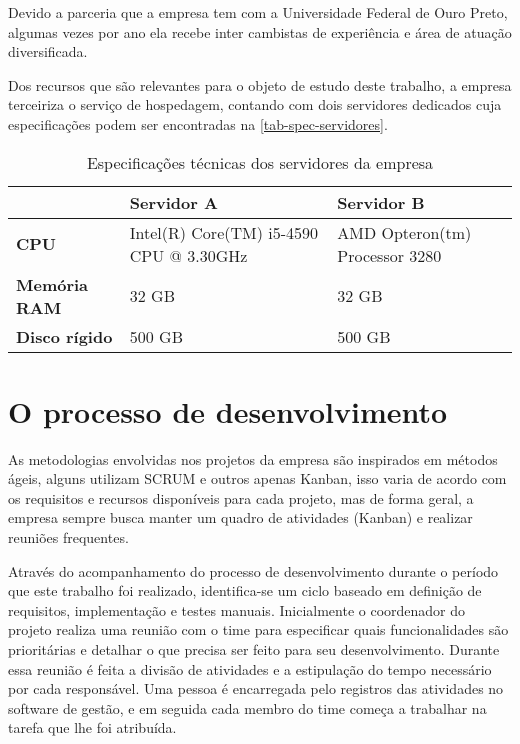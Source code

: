 \documentclass[
	12pt,				%
	openright,			%
	twoside,			%
	a4paper,			%
	english,			%
	french,				%
	spanish,			%
	brazil,				%
	]{abntex2}
\begin{document}
Devido a parceria que a empresa tem com a Universidade Federal de Ouro Preto, algumas vezes por ano ela recebe inter cambistas de experiência e área de atuação diversificada.

Dos recursos que são relevantes para o objeto de estudo deste trabalho, a empresa terceiriza o serviço de hospedagem, contando com dois servidores dedicados cuja especificações podem ser encontradas na \autoref{tab-spec-servidores}.

\begin{table}[htb]
	\caption{Especificações técnicas dos servidores da empresa}

	\label{tab-spec-servidores}	
\begin{tabular}{p{3.85cm}|p{5.20cm}|p{5.20cm}}
	 & \textbf{Servidor A} & \textbf{Servidor B}  \\
	\hline
	\textbf{CPU} & Intel(R) Core(TM) i5-4590 CPU @ 3.30GHz & AMD Opteron(tm) Processor 3280 \\
	\hline
	\textbf{Memória RAM} & 32 GB & 32 GB \\
	\hline
	\textbf{Disco rígido} & 500 GB & 500 GB \\
\end{tabular}
\end{table}

\section{O processo de desenvolvimento} 

As metodologias envolvidas nos projetos da empresa são inspirados em métodos ágeis, alguns utilizam SCRUM e outros apenas Kanban, isso varia de acordo com os requisitos e recursos disponíveis para cada projeto, mas de forma geral, a empresa sempre busca manter um quadro de atividades (Kanban) e realizar reuniões frequentes.

Através do acompanhamento do processo de desenvolvimento durante o período que este trabalho foi realizado, identifica-se um ciclo baseado em definição de requisitos, implementação e testes manuais. Inicialmente o coordenador do projeto realiza uma reunião com o time para especificar quais funcionalidades são prioritárias e detalhar o que precisa ser feito para seu desenvolvimento. Durante essa reunião é feita a divisão de atividades e a estipulação do tempo necessário por cada responsável. Uma pessoa é encarregada pelo registros das atividades no software de gestão, e em seguida cada membro do time começa a trabalhar na tarefa que lhe foi atribuída.
\end{document}
